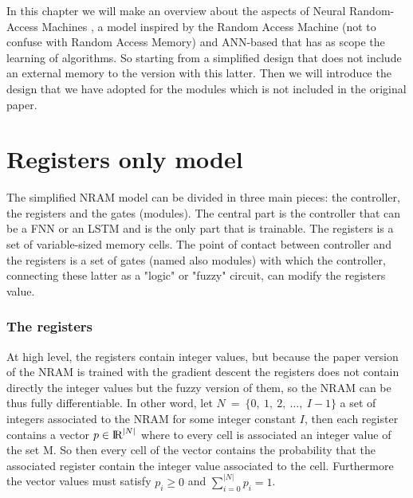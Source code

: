In this chapter we will make an overview about the aspects of Neural Random-Access Machines \cite{NRAM:2015}, a model inspired by the Random Access Machine (not to confuse with Random Access Memory) and ANN-based that has as scope the learning of algorithms. So starting from a simplified design that does not include an external memory to the version with this latter. Then we will introduce the design that we have adopted for the modules which is not included in the original paper. 


\section{Registers only model}
The simplified NRAM model can be divided in three main pieces: the controller, the registers and the gates (modules). The central part is the controller that can be a FNN or an LSTM and is the only part that is trainable. The registers is a set of variable-sized memory cells. The point of contact between controller and the registers is a set of gates (named also modules) with which the controller, connecting these latter as a "logic" or "fuzzy" circuit, can modify the registers value. 

\subsubsection*{The registers}
At high level, the registers contain integer values, but because the paper version of the NRAM is trained with the gradient descent the registers does not contain directly the integer values but the fuzzy version of them, so the NRAM can be thus fully differentiable. In other word, let $N\ =\ \{0,\ 1,\ 2,\ \dots,\ I - 1\}$ a set of integers associated to the NRAM for some integer constant $I$, then each register contains a vector $p \in \textrm{I\!R}^{|N|}$ where to every cell is associated an integer value of the set M. So then every cell of the vector contains the probability that the associated register contain the integer value associated to the cell. Furthermore the vector values must satisfy $p_{i} \geq 0$ and $\sum\limits_{i = 0}^{|N|} p_{i} = 1$.

